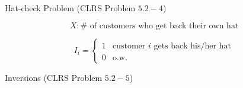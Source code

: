 
\begin{frame}{}
  \begin{exampleblock}{Hat-check Problem (CLRS Problem $5.2-4$)}
  \end{exampleblock}

  \pause
  \[
    X: \# \text{ of customers who get back their own hat}
  \]

  \[
    I_i = \left\{\begin{array}{lr}
      1 & \text{customer } i \text{ gets back his/her hat} \\
      0 & \text{o.w.}
    \end{array}\right.
  \]
\end{frame}

\begin{frame}{Inversions (CLRS Problem $5.2-5$)}
\end{frame}


